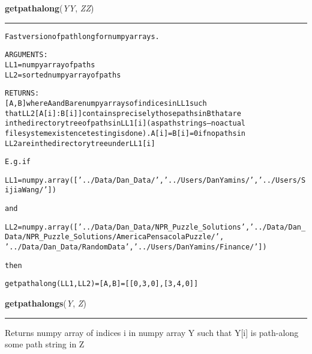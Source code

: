     \label{System:Utils:getpathalong}

    \vspace{0.5ex}

\hspace{.8\funcindent}\begin{boxedminipage}{\funcwidth}

    \raggedright \textbf{getpathalong}(\textit{YY}, \textit{ZZ})

    \vspace{-1.5ex}

    \rule{\textwidth}{0.5\fboxrule}
\setlength{\parskip}{2ex}
\begin{alltt}

Fast version of path long for numpy arrays. 

ARGUMENTS:
        LL1 = numpy array of paths
        LL2 = sorted numpy array of paths

RETURNS:
[A,B] where A and B are numpy arrays of indices in LL1 such 
that LL2[A[i]:B[i]] contains precisely those paths in B that are
in the directory tree of paths in LL1[i] ( as path strings -- no actual
filesystem existence testing is done).  A[i] = B[i] = 0 if no paths in 
LL2 are in the directory tree under LL1[i]
        
E.g. if 

LL1 = numpy.array(['../Data/Dan\_Data/', '../Users/DanYamins/','../Users/SijiaWang/'])

and

LL2 = numpy.array(['../Data/Dan\_Data/NPR\_Puzzle\_Solutions',     '../Data/Dan\_Data/NPR\_Puzzle\_Solutions/AmericaPensacolaPuzzle/',
'../Data/Dan\_Data/RandomData','../Users/DanYamins/Finance/'])

then

getpathalong(LL1,LL2) = [A,B] = [[0,3,0],[3,4,0]]
        
        
\end{alltt}

\setlength{\parskip}{1ex}
    \end{boxedminipage}

    \label{System:Utils:getpathalongs}

    \vspace{0.5ex}

\hspace{.8\funcindent}\begin{boxedminipage}{\funcwidth}

    \raggedright \textbf{getpathalongs}(\textit{Y}, \textit{Z})

    \vspace{-1.5ex}

    \rule{\textwidth}{0.5\fboxrule}
\setlength{\parskip}{2ex}
    Returns numpy array of indices i in numpy array Y such that Y[i] is 
    path-along some path string in Z

\setlength{\parskip}{1ex}
    \end{boxedminipage}

